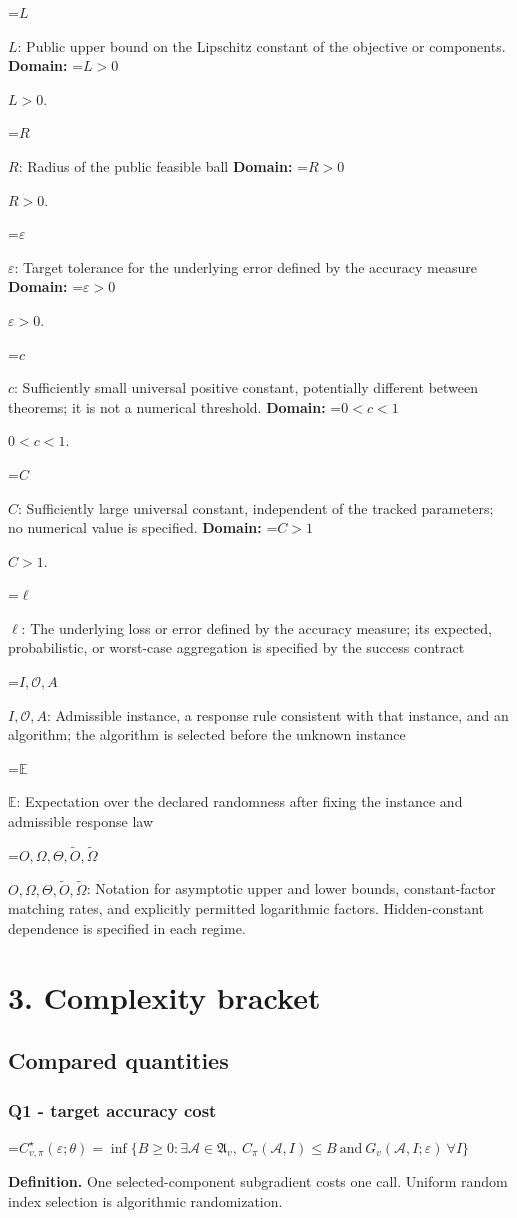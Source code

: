 \documentclass[10pt,a4paper]{article}
\newcommand{\AtlasMath}[1]{\par\begingroup\centering\setbox0=\hbox{$\displaystyle #1$}\ifdim\wd0>1.4\linewidth\typeout{ATLAS WIDE FORMULA: \the\wd0}\fi\ifdim\wd0>\linewidth\resizebox{\linewidth}{!}{\box0}\else\box0\fi\par\endgroup}
\newcommand{\AtlasInlineMath}[1]{\begingroup\setbox0=\hbox{$#1$}\ifdim\wd0>.4\linewidth\endgroup\AtlasMath{#1}\else\endgroup$#1$\fi}
\begin{document}
\AtlasInlineMath{L}: Public upper bound on the Lipschitz constant of the objective or components. \textbf{Domain:} \AtlasInlineMath{L>0}.

\AtlasInlineMath{R}: Radius of the public feasible ball \textbf{Domain:} \AtlasInlineMath{R>0}.

\AtlasInlineMath{\varepsilon}: Target tolerance for the underlying error defined by the accuracy measure \textbf{Domain:} \AtlasInlineMath{\varepsilon>0}.

\AtlasInlineMath{c}: Sufficiently small universal positive constant, potentially different between theorems; it is not a numerical threshold. \textbf{Domain:} \AtlasInlineMath{0<c<1}.

\AtlasInlineMath{C}: Sufficiently large universal constant, independent of the tracked parameters; no numerical value is specified. \textbf{Domain:} \AtlasInlineMath{C>1}.

\AtlasInlineMath{\ell}: The underlying loss or error defined by the accuracy measure; its expected, probabilistic, or worst-case aggregation is specified by the success contract

\AtlasInlineMath{I,\mathcal{O},A}: Admissible instance, a response rule consistent with that instance, and an algorithm; the algorithm is selected before the unknown instance

\AtlasInlineMath{\mathbb{E}}: Expectation over the declared randomness after fixing the instance and admissible response law

\AtlasInlineMath{O,\Omega,\Theta,\widetilde{O},\widetilde\Omega}: Notation for asymptotic upper and lower bounds, constant-factor matching rates, and explicitly permitted logarithmic factors. Hidden-constant dependence is specified in each regime.

\section{3. Complexity bracket}
\subsection{Compared quantities}
\subsubsection{Q1 - target accuracy cost}
\AtlasMath{C^\star_{v,\pi}(\varepsilon;\theta)=\inf\{B\ge0:\exists\mathcal A\in\mathfrak A_v,\ C_\pi(\mathcal A,I)\le B\ \text{and}\ G_v(\mathcal A,I;\varepsilon)\ \forall I\}}
\textbf{Definition.} One selected-component subgradient costs one call. Uniform random index selection is algorithmic randomization.
\end{document}

